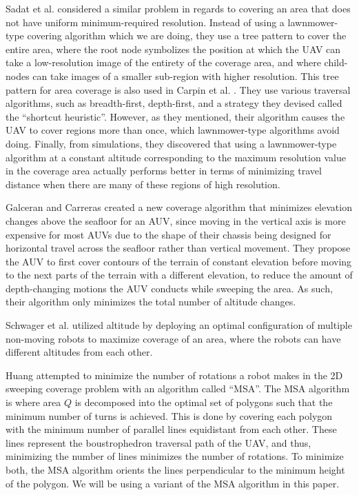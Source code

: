 \documentclass[conference]{IEEEtran}
\theoremstyle{plain}%
\begin{document}
Sadat et al. \cite{sadat2014recursive} considered a similar problem in regards to covering an area that does not have uniform minimum-required resolution. Instead of using a lawnmower-type covering algorithm which we are doing, they use a tree pattern to cover the entire area, where the root node symbolizes the position at which the UAV can take a low-resolution image of the entirety of the coverage area, and where child-nodes can take images of a smaller sub-region with higher resolution. This tree pattern for area coverage is also used in Carpin et al. \cite{carpin2013variable}. They use various traversal algorithms, such as breadth-first, depth-first, and a strategy they devised called the ``shortcut heuristic''. However, as they mentioned, their algorithm causes the UAV to cover  regions more than once, which lawnmower-type algorithms avoid doing. Finally, from simulations, they discovered that using a lawnmower-type algorithm at a constant altitude corresponding to the maximum resolution value in the coverage area actually performs better in terms of minimizing travel distance when there are many of these regions of high resolution.

Galceran and Carreras \cite{galceran2013planning} created a new coverage algorithm that minimizes elevation changes above the seafloor for an AUV, since moving in the vertical axis is more expensive for most AUVs due to the shape of their chassis being designed for horizontal travel across the seafloor rather than vertical movement. They propose the AUV to first cover contours of the terrain of constant elevation before moving to the next parts of the terrain with a different elevation, to reduce the amount of depth-changing motions the AUV conducts while sweeping the area. As such, their algorithm only minimizes the total number of altitude changes.

Schwager et al. \cite{schwager2011eyes} utilized altitude by deploying an optimal configuration of multiple non-moving robots to maximize coverage of an area, where the robots can have different altitudes from each other.

Huang \cite{huang2001optimal} attempted to minimize the number of rotations a robot makes in the 2D sweeping coverage problem with an algorithm called ``MSA''. The MSA algorithm is where area $Q$ is decomposed into the optimal set of polygons such that the minimum number of turns is achieved. This is done by covering each polygon with the minimum number of parallel lines equidistant from each other. These lines represent the boustrophedron traversal path of the UAV, and thus, minimizing the number of lines minimizes the number of rotations. To minimize both, the MSA algorithm orients the lines perpendicular to the minimum height of the polygon. We will be using a variant of the MSA algorithm in this paper.
\end{document}
